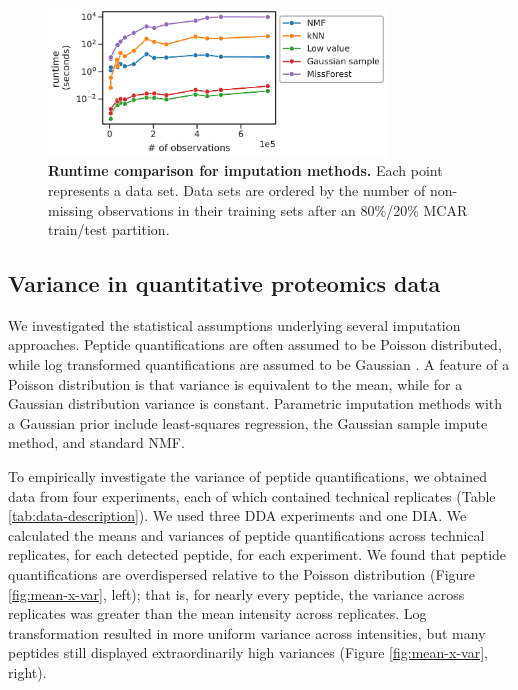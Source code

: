 \documentclass{article}
\begin{document}
\begin{figure}
  \centering
  \includegraphics[width=0.8\textwidth]{figures/runtimes-figure.pdf}
  \caption{{\bf Runtime comparison for imputation methods.} Each point represents a data set. Data sets are ordered by the number of non-missing observations in their training sets after an 80\%/20\% MCAR train/test partition.}
  \label{fig:runtime}
\end{figure} 

\subsection{Variance in quantitative proteomics data}

We investigated the statistical assumptions underlying several imputation approaches. Peptide quantifications are often assumed to be Poisson distributed, while log transformed quantifications are assumed to be Gaussian \cite{ms-dist-derivation, stat-theory-lcms, kimmel-2005}. A feature of a Poisson distribution is that variance is equivalent to the mean, while for a Gaussian distribution variance is constant. Parametric imputation methods with a Gaussian prior include least-squares regression, the Gaussian sample impute method, and standard NMF.

To empirically investigate the variance of peptide quantifications, we obtained data from four experiments, each of which contained technical replicates (Table \ref{tab:data-description}). We used three DDA experiments and one DIA. We calculated the means and variances of peptide quantifications across technical replicates, for each detected peptide, for each experiment. We found that peptide quantifications are overdispersed relative to the Poisson distribution (Figure \ref{fig:mean-x-var}, left); that is, for nearly every peptide, the variance across replicates was greater than the mean intensity across replicates. Log transformation resulted in more uniform variance across intensities, but many peptides still displayed extraordinarily high variances (Figure \ref{fig:mean-x-var}, right). 
\end{document}
